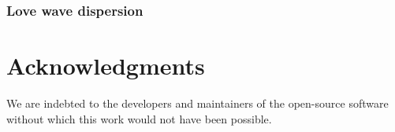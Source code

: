 \documentclass[onecolumn]{article}
\begin{document}
\subsubsection{Love wave dispersion}


\section{Acknowledgments}

We are indebted to the developers and maintainers of the open-source
software without which this work would not have been possible.




\end{document}
